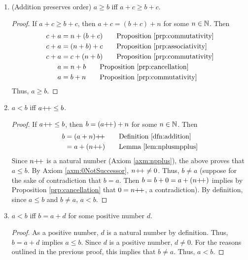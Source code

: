 \documentclass[../main.tex]{subfiles}
\begin{document}
\begin{enumerate}[ref={\thesection.\arabic*}]
\begin{prp}
\begin{enumerate}[label={\textup{(}\alph*\textup{)}}]
\begin{proof}
            \end{proof}
            \item \textup{(}Addition preserves order\textup{)} $a\geq b$ iff $a+c\geq b+c$.
            \begin{proof}
                If $a+c\geq b+c$, then $a+c=(b+c)+n$ for some $n\in\mathbb{N}$. Then
                \begin{align*}
                    c+a &= n+(b+c)\tag*{Proposition \ref{prp:commutativity}}\\
                    c+a &= (n+b)+c\tag*{Proposition \ref{prp:associativity}}\\
                    c+a &= c+(n+b)\tag*{Proposition \ref{prp:commutativity}}\\
                    a &= n+b\tag*{Proposition \ref{prp:cancellation}}\\
                    a &= b+n\tag*{Proposition \ref{prp:commutativity}}\\
                \end{align*}
                Thus, $a\geq b$.
            \end{proof}
            \item $a<b$ iff $a{+\!+}\leq b$.
            \begin{proof}
                If $a{+\!+}\leq b$, then $b=(a{+\!+})+n$ for some $n\in\mathbb{N}$. Then
                \begin{align*}
                    b &= (a+n)\pplus\tag*{Definition \ref{dfn:addition}}\\
                    &= a+(n\pplus)\tag*{Lemma \ref{lem:nplusmpplus}}
                \end{align*}
                Since $n{+\!+}$ is a natural number (Axiom \ref{axm:npplus}), the above proves that $a\leq b$. By Axiom \ref{axm:0NotSuccessor}, $n{+\!+}\neq 0$. Thus, $b\neq a$ (suppose for the sake of contradiction that $b=a$. Then $b=b+0=a+(n{+\!+})$ implies by Proposition \ref{prp:cancellation} that $0=n{+\!+}$, a contradiction). By definition, since $a\leq b$ and $b\neq a$, $a<b$.
            \end{proof}
            \item $a<b$ iff $b=a+d$ for some positive number $d$.
            \begin{proof}
                As a positive number, $d$ is a natural number by definition. Thus, $b=a+d$ implies $a\leq b$. Since $d$ is a positive number, $d\neq 0$. For the reasons outlined in the previous proof, this implies that $b\neq a$. Thus, $a<b$.
            \end{proof}

\end{enumerate}
\end{prp}
\end{enumerate}
\end{document}
